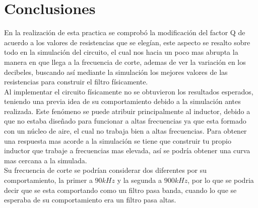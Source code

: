 \documentclass[letterpaper,12pt]{article}
\begin{document}
\section*{Conclusiones}
En la realización de esta practica se comprobó la modificación del factor Q de acuerdo a los valores de resistencias que se elegían, este aspecto se resalto sobre todo en la simulación del circuito, el cual nos hacia un poco mas abrupta la manera en que llega a la frecuencia de corte, ademas de ver la variación en los decibeles, buscando así mediante la simulación los mejores valores de las resistencias para construir  el filtro físicamente.  
\\
Al implementar el circuito físicamente no se obtuvieron los resultados esperados, teniendo una previa idea de su comportamiento debido a la simulación antes realizada. Este fenómeno se puede atribuir principalmente al inductor, debido a que no estaba diseñado para funcionar a altas frecuencias ya que esta formado con un núcleo de aire, el cual no trabaja bien a altas frecuencias. Para obtener una respuesta mas acorde a la simulación se tiene que construir tu propio inductor que trabaje a frecuencias mas elevada, así se podría obtener una curva  mas cercana a la simulada.\\
Su frecuencia de corte se podrían considerar dos diferentes por su comportamiento, la primer a $90kHz$ y la segunda a $900kHz$, por lo que se podria decir que se esta comportando como un filtro pasa banda, cuando lo que se esperaba de su comportamiento era un filtro pasa altas.
   
 
\end{document}
